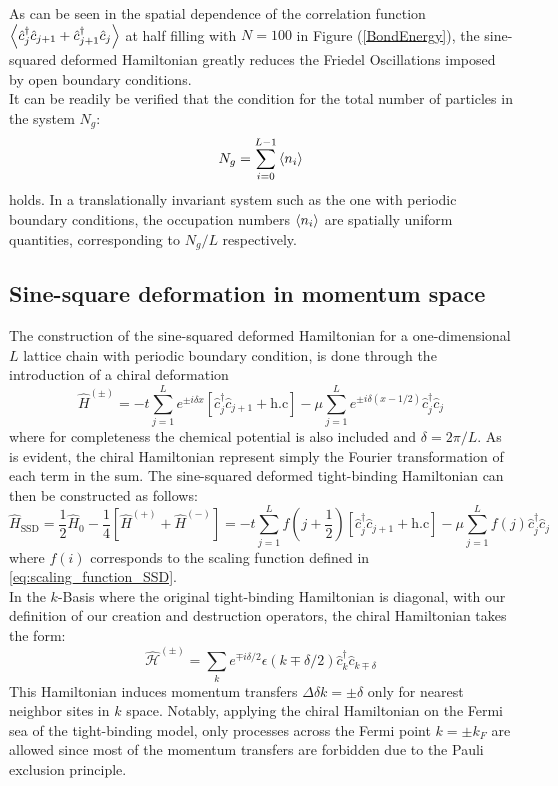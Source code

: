 \documentclass[11pt, a4paper]{article}
\theoremstyle{definition} %
\begin{document}
As can be seen in the spatial dependence of the correlation function $\expval{\hat{c}_j^\dagger \hat{c}_{j+1} + \hat{c}_{j+1}^\dagger \hat{c}_j}$ at half filling with $N=100$ in Figure (\ref{BondEnergy}), the sine-squared deformed Hamiltonian greatly reduces the Friedel Oscillations imposed by open boundary conditions. \\


It can be readily be verified that the condition for the total number of particles in the system $N_g$:
\begin{equation}
	N_g = \sum_{i=0}^{L-1} \expval{n_i}
\end{equation}
holds. In a translationally invariant system such as the one with periodic boundary conditions, the occupation numbers $\expval{n_i}$ are spatially uniform quantities, corresponding to $N_g/L$ respectively.


\subsection{Sine-square deformation in momentum space}
The construction of the sine-squared deformed Hamiltonian for a one-dimensional $L$ lattice chain with periodic boundary condition, is done through the introduction of a chiral deformation 
\begin{equation}
	\hat{H}^{(\pm)} = - t \sum_{j=1}^L e^{\pm i \delta x} [\hat{c}_j^\dagger \hat{c}_{j+1} + \text{h.c}] - \mu \sum_{j=1}^L e^{\pm i \delta(x - 1/2)} \hat{c}^\dagger_j \hat{c}_j
\end{equation}
where for completeness the chemical potential is also included and $\delta = 2\pi/L$. As is evident, the chiral Hamiltonian represent simply the Fourier transformation of each term in the sum. The sine-squared deformed tight-binding Hamiltonian can then be constructed as follows:
\begin{equation}
	\hat{H}_{\text{SSD}} = \frac{1}{2} \hat{H}_0 - \frac{1}{4} \left[\hat{H}^{(+)} + \hat{H}^{(-)}\right] = -t \sum_{j=1}^{L} f\left(j + \frac{1}{2}\right)[\hat{c}^\dagger_j \hat{c}_{j+1} + \text{h.c}] - \mu \sum_{j=1}^L f(j) \hat{c}_j^\dagger \hat{c}_j
	\label{eq:SSD_Hamiltonian_chiral}
\end{equation}
where $f(i)$ corresponds to the scaling function defined in \ref{eq:scaling_function_SSD}. \\


In the $k$-Basis where the original tight-binding Hamiltonian is diagonal, with our definition of our creation and destruction operators, the chiral Hamiltonian takes the form:
\begin{equation}
	\hat{\mathcal{H}}^{(\pm)} = \sum_k e^{\mp i \delta/2} \epsilon(k \mp \delta/2) \hat{c}_k^\dagger \hat{c}_{k \mp \delta}
\end{equation}
This Hamiltonian induces momentum transfers $\Delta \delta k = \pm \delta$ only for nearest neighbor sites in $k$ space. Notably, applying the chiral Hamiltonian on the Fermi sea of the tight-binding model, only processes across the Fermi point $k = \pm k_F$ are allowed since most of the momentum transfers are forbidden due to the Pauli exclusion principle.
\end{document}
